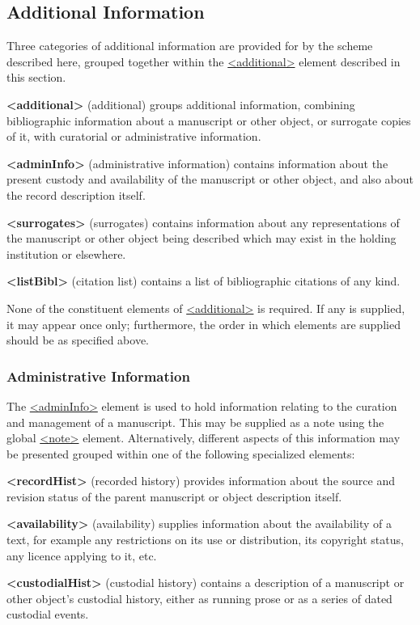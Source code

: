 \subsection[{Additional Information}]{Additional Information}\label{msad}\par
Three categories of additional information are provided for by the scheme described here, grouped together within the \hyperref[TEI.additional]{<additional>} element described in this section. 
\begin{sansreflist}
  
\item [\textbf{<additional>}] (additional) groups additional information, combining bibliographic information about a manuscript or other object, or surrogate copies of it, with curatorial or administrative information.
\item [\textbf{<adminInfo>}] (administrative information) contains information about the present custody and availability of the manuscript or other object, and also about the record description itself.
\item [\textbf{<surrogates>}] (surrogates) contains information about any representations of the manuscript or other object being described which may exist in the holding institution or elsewhere.
\item [\textbf{<listBibl>}] (citation list) contains a list of bibliographic citations of any kind.
\end{sansreflist}
\par
None of the constituent elements of \hyperref[TEI.additional]{<additional>} is required. If any is supplied, it may appear once only; furthermore, the order in which elements are supplied should be as specified above.
\subsubsection[{Administrative Information}]{Administrative Information}\label{msadad}\par
The \hyperref[TEI.adminInfo]{<adminInfo>} element is used to hold information relating to the curation and management of a manuscript. This may be supplied as a note using the global \hyperref[TEI.note]{<note>} element. Alternatively, different aspects of this information may be presented grouped within one of the following specialized elements: 
\begin{sansreflist}
  
\item [\textbf{<recordHist>}] (recorded history) provides information about the source and revision status of the parent manuscript or object description itself.
\item [\textbf{<availability>}] (availability) supplies information about the availability of a text, for example any restrictions on its use or distribution, its copyright status, any licence applying to it, etc.
\item [\textbf{<custodialHist>}] (custodial history) contains a description of a manuscript or other object's custodial history, either as running prose or as a series of dated custodial events.
\end{sansreflist}

